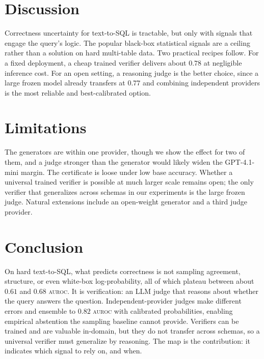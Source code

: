 \documentclass[11pt]{article}
\newcommand{\auroc}{\textsc{auroc}}
\begin{document}
\section{Discussion}
Correctness uncertainty for text-to-SQL is tractable, but only with signals that engage the query's
logic. The popular black-box statistical signals are a ceiling rather than a solution on hard
multi-table data. Two practical recipes follow. For a fixed deployment, a cheap trained verifier
delivers about $0.78$ at negligible inference cost. For an open setting, a reasoning judge is the
better choice, since a large frozen model already transfers at $0.77$ and combining independent
providers is the most reliable and best-calibrated option.

\section{Limitations}
The generators are within one provider, though we show the effect for two of them, and a judge
stronger than the generator would likely widen the GPT-4.1-mini margin. The certificate is loose under
low base accuracy. Whether a universal trained verifier is possible at much larger scale remains
open; the only verifier that generalizes across schemas in our experiments is the large frozen judge.
Natural extensions include an open-weight generator and a third judge provider.

\section{Conclusion}
On hard text-to-SQL, what predicts correctness is not sampling agreement, structure, or even
white-box log-probability, all of which plateau between about $0.61$ and $0.68$ \auroc{}. It is
verification: an LLM judge that reasons about whether the query answers the question.
Independent-provider judges make different errors and ensemble to $0.82$ \auroc{} with calibrated
probabilities, enabling empirical abstention the sampling baseline cannot provide. Verifiers can be
trained and are valuable in-domain, but they do not transfer across schemas, so a universal verifier
must generalize by reasoning. The map is the contribution: it indicates which signal to rely on, and
when.

\appendix
\end{document}
